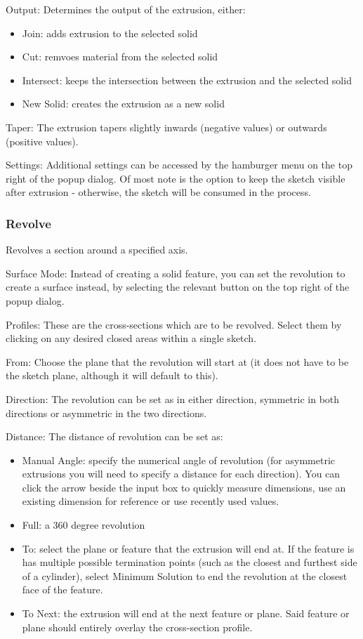 Output:
Determines the output of the extrusion, either:
\begin{itemize}
    \item Join: adds extrusion to the selected solid
    \item Cut: remvoes material from the selected solid
    \item Intersect: keeps the intersection between the extrusion and the selected solid
    \item New Solid: creates the extrusion as a new solid
\end{itemize}

Taper:
The extrusion tapers slightly inwards (negative values) or outwards (positive values).

Settings:
Additional settings can be accessed by the hamburger menu on the top right of the popup dialog. Of most note is the option to keep the sketch visible after extrusion - otherwise, the sketch will be consumed in the process.

\subsubsection{Revolve}
Revolves a section around a specified axis.

Surface Mode:
Instead of creating a solid feature, you can set the revolution to create a surface instead, by selecting the relevant button on the top right of the popup dialog.

Profiles:
These are the cross-sections which are to be revolved. Select them by clicking on any desired closed areas within a single sketch.

From:
Choose the plane that the revolution will start at (it does not have to be the sketch plane, although it will default to this).

Direction:
The revolution can be set as in either direction, symmetric in both directions or asymmetric in the two directions.

Distance:
The distance of revolution can be set as:

\begin{itemize}
    \item Manual Angle: specify the numerical angle of revolution (for asymmetric extrusions you will need to specify a distance for each direction). You can click the arrow beside the input box to quickly measure dimensions, use an existing dimension for reference or use recently used values.
    \item Full: a 360 degree revolution
    \item To: select the plane or feature that the extrusion will end at. If the feature is has multiple possible termination points (such as the closest and furthest side of a cylinder), select Minimum Solution to end the revolution at the closest face of the feature.
    \item To Next: the extrusion will end at the next feature or plane. Said feature or plane should entirely overlay the cross-section profile.
\end{itemize}

